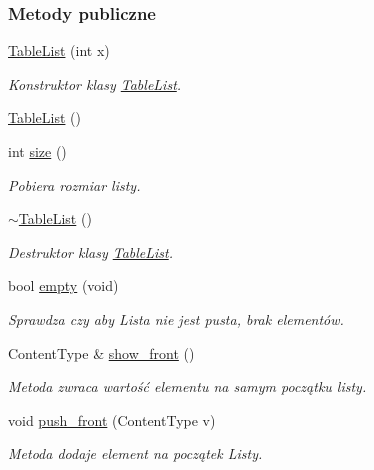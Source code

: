 \subsubsection*{Metody publiczne}
\begin{DoxyCompactItemize}
\item 
\hyperlink{class_table_list_a47a1bbbae3c53c5d8b21d1a136cdea9c}{Table\-List} (int x)
\begin{DoxyCompactList}\small\item\em Konstruktor klasy \hyperlink{class_table_list}{Table\-List}. \end{DoxyCompactList}\item 
\hyperlink{class_table_list_a64df8a3b807cc133ff4765e63e02e185}{Table\-List} ()
\item 
int \hyperlink{class_table_list_a6f6a98b327876819e37a772ebcb31397}{size} ()
\begin{DoxyCompactList}\small\item\em Pobiera rozmiar listy. \end{DoxyCompactList}\item 
\hyperlink{class_table_list_a5a897720624f4642b053de10c3fe2c80}{$\sim$\-Table\-List} ()
\begin{DoxyCompactList}\small\item\em Destruktor klasy \hyperlink{class_table_list}{Table\-List}. \end{DoxyCompactList}\item 
bool \hyperlink{class_table_list_a34cc5c57e27b953da15a9a4c9231991c}{empty} (void)
\begin{DoxyCompactList}\small\item\em Sprawdza czy aby Lista nie jest pusta, brak elementów. \end{DoxyCompactList}\item 
Content\-Type \& \hyperlink{class_table_list_af4be5503b1239d7e18d3e384feff9fe5}{show\-\_\-front} ()
\begin{DoxyCompactList}\small\item\em Metoda zwraca wartość elementu na samym początku listy. \end{DoxyCompactList}\item 
void \hyperlink{class_table_list_a86e10ad40adb232d823de621cad47906}{push\-\_\-front} (Content\-Type v)
\begin{DoxyCompactList}\small\item\em Metoda dodaje element na początek Listy. \end{DoxyCompactList}\item 

\end{DoxyCompactItemize}
